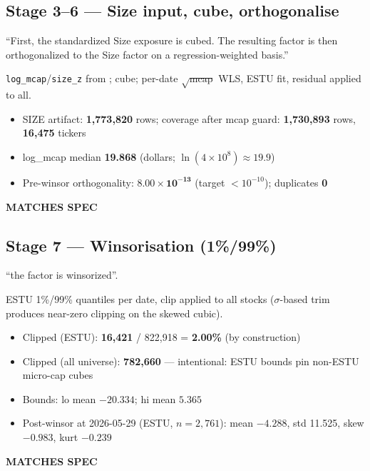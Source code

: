 \documentclass[11pt,a4paper]{article}
\newcommand{\PASS}[1]{\textcolor{pass}{\textbf{#1}}}
\begin{document}
\subsection{Stage 3--6 --- Size input, cube, orthogonalise}

\begin{description}[style=nextline]
  \item[PDF SPEC] ``First, the standardized Size exposure is cubed. The resulting factor is then orthogonalized to the Size factor on a regression-weighted basis.''
  \item[Implementation] \texttt{log\_mcap}/\texttt{size\_z} from ; cube; per-date $\sqrt{\text{mcap}}$ WLS, ESTU fit, residual applied to all.
  \item[Observed]\phantom{x}
    \begin{itemize}[nosep, topsep=-\parskip]
      \item SIZE artifact: \textbf{1{,}773{,}820} rows; coverage after mcap guard: \textbf{1{,}730{,}893} rows, \textbf{16{,}475} tickers
      \item log\_mcap median \textbf{19.868} (dollars; $\ln(4\times10^{8})\approx19.9$)
      \item Pre-winsor orthogonality: $\mathbf{8.00\times10^{-13}}$ (target $<10^{-10}$); duplicates \textbf{0}
    \end{itemize}
  \item[Status] \PASS{MATCHES SPEC}
\end{description}

\subsection{Stage 7 --- Winsorisation (1\%/99\%)}

\begin{description}[style=nextline]
  \item[PDF SPEC] ``the factor is winsorized''.
  \item[Implementation] ESTU 1\%/99\% quantiles per date, clip applied to all stocks ($\sigma$-based trim produces near-zero clipping on the skewed cubic).
  \item[Observed]\phantom{x}
    \begin{itemize}[nosep, topsep=-\parskip]
      \item Clipped (ESTU): \textbf{16{,}421} / 822{,}918 = \textbf{2.00\%} (by construction)
      \item Clipped (all universe): \textbf{782{,}660} --- intentional: ESTU bounds pin non-ESTU micro-cap cubes
      \item Bounds: lo mean $-20.334$; hi mean $5.365$
      \item Post-winsor at 2026-05-29 (ESTU, $n=2{,}761$): mean $-4.288$, std 11.525, skew $-0.983$, kurt $-0.239$
    \end{itemize}
  \item[Status] \PASS{MATCHES SPEC}
\end{description}
\end{document}

